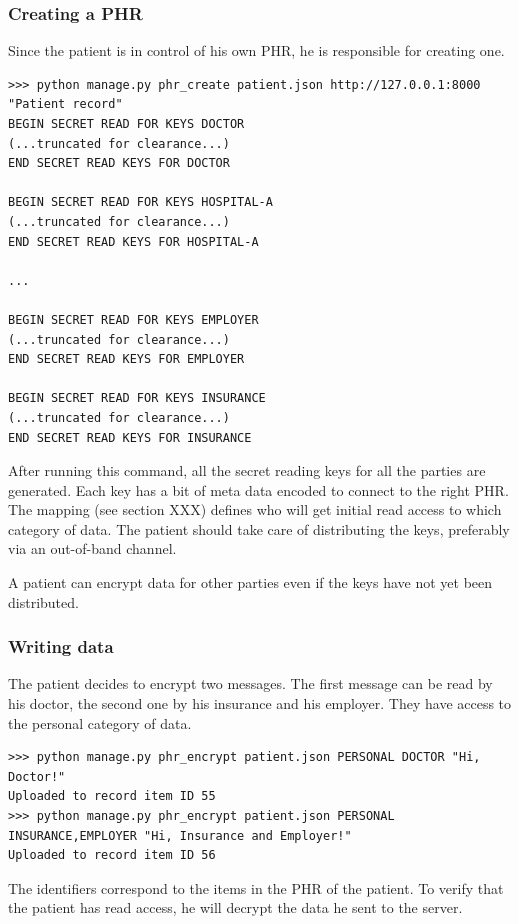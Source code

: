 \documentclass[a4paper]{article}
\begin{document}
		\subsubsection{Creating a PHR}\label{sec:usecase_1}
			Since the patient is in control of his own PHR, he is responsible for creating one.
		
			\begin{lstlisting}
>>> python manage.py phr_create patient.json http://127.0.0.1:8000 "Patient record"
BEGIN SECRET READ FOR KEYS DOCTOR
(...truncated for clearance...)
END SECRET READ KEYS FOR DOCTOR

BEGIN SECRET READ FOR KEYS HOSPITAL-A
(...truncated for clearance...)
END SECRET READ KEYS FOR HOSPITAL-A

...

BEGIN SECRET READ FOR KEYS EMPLOYER
(...truncated for clearance...)
END SECRET READ KEYS FOR EMPLOYER

BEGIN SECRET READ FOR KEYS INSURANCE
(...truncated for clearance...)
END SECRET READ KEYS FOR INSURANCE
			\end{lstlisting}
		
			After running this command, all the secret reading keys for all the parties are generated. Each key has a bit of meta data encoded to connect to the right PHR. The mapping (see section XXX) defines who will get initial read access to which category of data. The patient should take care of distributing the keys, preferably via an out-of-band channel.
		
			A patient can encrypt data for other parties even if the keys have not yet been distributed.
		
		\subsubsection{Writing data}\label{sec:usecase_2}
			The patient decides to encrypt two messages. The first message can be read by his doctor, the second one by his insurance and his employer. They have access to the personal category of data.
		
			\begin{lstlisting}
>>> python manage.py phr_encrypt patient.json PERSONAL DOCTOR "Hi, Doctor!"
Uploaded to record item ID 55
>>> python manage.py phr_encrypt patient.json PERSONAL INSURANCE,EMPLOYER "Hi, Insurance and Employer!"
Uploaded to record item ID 56
			\end{lstlisting}
		
			The identifiers correspond to the items in the PHR of the patient. To verify that the patient has read access, he will decrypt the data he sent to the server.
		
\end{document}
